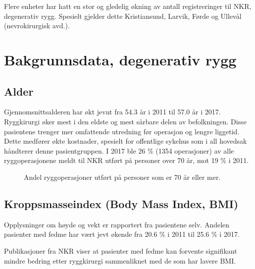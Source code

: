 Flere enheter har hatt en stor og gledelig økning av antall registreringer til NKR, degenerativ rygg. Spesielt gjelder dette Kristiansund, Larvik, Førde og Ullevål (nevrokirurgisk avd.).

\clearpage



\section{Bakgrunnsdata, degenerativ rygg}


\subsection{Alder}




Gjennomsnittsalderen har økt jevnt fra 54.3 år 
i 2011 til 57.0 år i 2017. 
Ryggkirurgi øker mest i den eldste og mest sårbare delen av
befolkningen. Disse pasientene trenger mer omfattende utredning før operasjon og
lengre liggetid. Dette medfører økte kostnader, spesielt for offentlige sykehus som i
all hovedsak håndterer denne pasientgruppen. I 2017 ble 26 \% 
(1354 
operasjoner) av alle
ryggoperasjonene meldt til NKR utført på personer over 70 år, mot 19 \% 
i 2011. 

\begin{figure}[ht]
\caption{\label{fig:Alder70} Andel ryggoperasjoner utført på personer som er 70 år eller mer.}
\end{figure}





\subsection{Kroppsmasseindex (Body Mass Index, BMI)}



Opplysninger om høyde og vekt er rapportert fra pasientene selv.
Andelen pasienter med fedme har vært jevt økende fra 
20.6 \% 
i 2011
til 25.6 \%
i  2017.

Publikasjoner fra NKR viser at pasienter med fedme kan forvente signifikant mindre bedring etter 
ryggkirurgi sammenliknet med de som har lavere BMI. 




